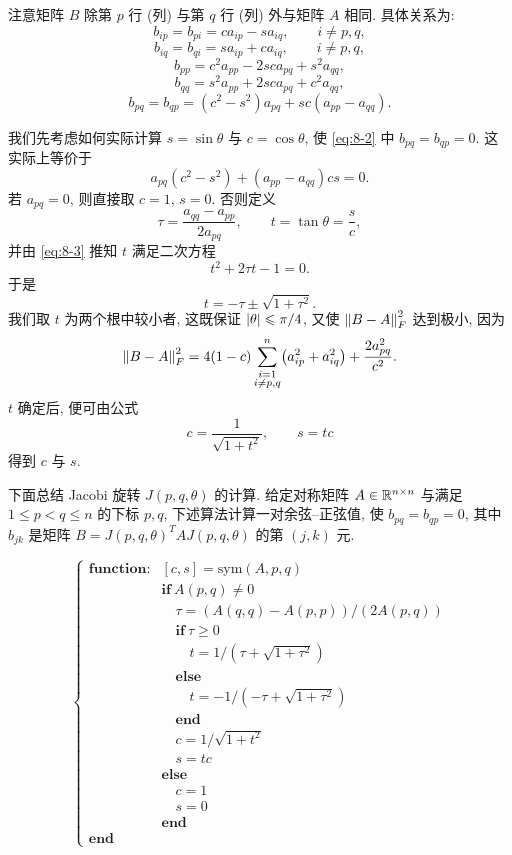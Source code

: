 注意矩阵 $B$ 除第 $p$ 行 (列) 与第 $q$ 行 (列) 外与矩阵 $A$ 相同. 具体关系为:
\[
  b_{ip}=b_{pi}=ca_{ip}-sa_{iq},
  \qquad i\neq p,q,
\]
\[
  b_{iq}=b_{qi}=sa_{ip}+ca_{iq},
  \qquad i\neq p,q,
\]
\[
  b_{pp}=c^2a_{pp}-2sca_{pq}+s^2a_{qq},
\]
\[
  b_{qq}=s^2a_{pp}+2sca_{pq}+c^2a_{qq},
\]
\[
  b_{pq}=b_{qp}=(c^2-s^2)a_{pq}+sc(a_{pp}-a_{qq}).
\]

我们先考虑如何实际计算 $s=\sin\theta$ 与 $c=\cos\theta$, 使 \eqref{eq:8-2} 中 $b_{pq}=b_{qp}=0$. 这实际上等价于
\begin{equation}
  a_{pq}(c^2-s^2)+(a_{pp}-a_{qq})cs=0.
  \label{eq:8-3}
\end{equation}
若 $a_{pq}=0$, 则直接取 $c=1$, $s=0$. 否则定义
\[
  \tau=\frac{a_{qq}-a_{pp}}{2a_{pq}},
  \qquad
  t=\tan\theta=\frac{s}{c},
\]
并由 \eqref{eq:8-3} 推知 $t$ 满足二次方程
\[
  t^2+2\tau t-1=0.
\]
于是
\[
  t=-\tau\pm\sqrt{1+\tau^2}.
\]
我们取 $t$ 为两个根中较小者, 这既保证 $\left|\theta\right|\leqslant\pi/4$, 又使 $\left\|B-A\right\|_F^2$ 达到极小, 因为
\[
  \left\|B-A\right\|_F^2
  =4(1-c)\sum_{\substack{i=1\\ i\neq p,q}}^{n}\bigl(a_{ip}^2+a_{iq}^2\bigr)
  +\frac{2a_{pq}^2}{c^2}.
\]
$t$ 确定后, 便可由公式
\[
  c=\frac{1}{\sqrt{1+t^2}},
  \qquad
  s=tc
\]
得到 $c$ 与 $s$.

下面总结 Jacobi 旋转 $J(p,q,\theta)$ 的计算. 给定对称矩阵 $A\in\mathbb{R}^{n\times n}$ 与满足 $1\leqslant p<q\leqslant n$ 的下标 $p,q$, 下述算法计算一对余弦–正弦值, 使 $b_{pq}=b_{qp}=0$, 其中 $b_{jk}$ 是矩阵 $B=J(p,q,\theta)^TAJ(p,q,\theta)$ 的第 $(j,k)$ 元.

\par\medskip
{}
\label{alg:8-4}
\par
\smallskip
  \[
    \left\{
    \begin{array}{ll}
      \textbf{function}: & [c,s]=\mathrm{sym}(A,p,q)\\
        & \textbf{if}\ A(p,q)\neq0\\
        & \quad \tau=(A(q,q)-A(p,p))/(2A(p,q))\\
        & \quad \textbf{if}\ \tau\geqslant0\\
        & \qquad t=1/(\tau+\sqrt{1+\tau^2})\\
        & \quad \textbf{else}\\
        & \qquad t=-1/(-\tau+\sqrt{1+\tau^2})\\
        & \quad \textbf{end}\\
        & \quad c=1/\sqrt{1+t^2}\\
        & \quad s=tc\\
        & \textbf{else}\\
        & \quad c=1\\
        & \quad s=0\\
        & \textbf{end}\\
      \textbf{end}
    \end{array}
    \right.
  \]
\par\medskip

